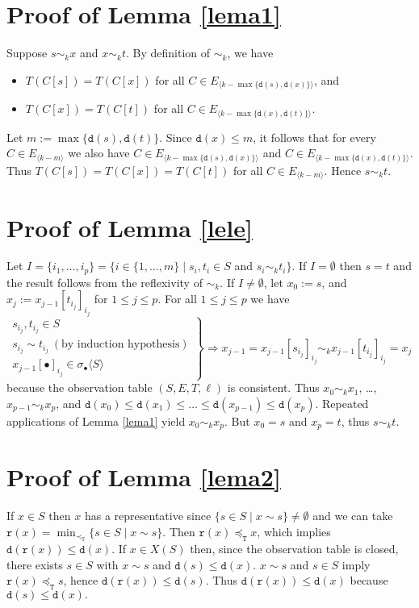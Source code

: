 \documentclass[preprint,12pt,english]{article}
\def\hole{\bullet}
\def\tr{\mathtt{r}}
\def\depth{\mathtt{d}}
\newcommand\pair[1]{\langle{#1}\rangle}
\begin{document}
\section{Proof of Lemma \ref{lema1}}
Suppose  $s\sim_k x$ and $x\sim_k t.$ By definition of $\sim_k$, we have 
\begin{itemize}
\item[] $T(C[s])=T(C[x])$ for all $C\in E_{\pair{k-\max\{\depth(s),\depth(x)\}}}$, and
\item[] $T(C[x])=T(C[t])$ for all $C\in E_{\pair{k-\max\{\depth(x),\depth(t)\}}}$.
\end{itemize}
Let $m:=\max\{\depth(s),\depth(t)\}.$ Since $\depth(x)\leq m$, it follows that for every $C\in  E_{\pair{k-m}}$ we also have $C\in E_{\pair{k-\max\{\depth(s),\depth(x)\}}}$ and $C\in E_{\pair{k-\max\{\depth(x),\depth(t)\}}}$. Thus $T(C[s])=T(C[x])=T(C[t])$ for all $C\in  E_{\pair{k-m}}$. Hence $s\sim_k t.$
\section{Proof of Lemma \ref{lele}}
Let $I=\{i_1,\ldots,i_p\}=\{i\in\{1,\ldots,m\}\mid s_i,t_i\in S$ and $s_i\sim_k t_i\}$. 
If $I=\emptyset$ then $s=t$ and the result follows from the reflexivity of $\sim_k$. 
If $I\neq\emptyset$, let $x_0:=s$, and $x_j:=x_{j-1}[t_{i_j}]_{i_j}$ for $1\leq j\leq p$.
For all $1\leq j\leq p$ we have
$$\left.\begin{array}{r}
s_{i_j},t_{i_j}\in S\\ 
s_{i_j}\sim t_{i_j}\ (\text{by induction hypothesis})\\
x_{j-1}[\hole]_{i_j}\in\sigma_\hole\pair{S} 
\end{array}\right\}\Rightarrow x_{j-1}=x_{j-1}[s_{i_j}]_{i_j}\sim_k x_{j-1}[t_{i_j}]_{i_j}=x_j$$
because the observation table $(S,E,T,\ell)$ is consistent. Thus $x_0\sim_k x_1$, \ldots, $x_{p-1}\sim_k x_p$, and $\depth(x_0)\leq\depth(x_1)\leq\ldots\leq\depth(x_{p-1})\leq\depth(x_p).$ Repeated applications of Lemma \ref{lema1} yield $x_0\sim_k x_p.$ But $x_0=s$ and $x_p=t$, thus $s\sim_k t.$
\section{Proof of Lemma \ref{lema2}}
If $x\in S$ then $x$ has a representative since $\{s\in S\mid x\sim s\}\neq\emptyset$ and we can take $\tr(x)=\min_{\prec_{\mathtt{T}}}\{s\in S\mid x\sim s\}$. Then $\tr(x)\preceq_{\mathtt{T}} x$, which implies $\depth(\tr(x))\leq \depth(x).$ If $x\in X(S)$ then, since the observation table is closed, there exists $s\in S$ with $x\sim s$ and $\depth(s)\leq \depth(x).$ $x\sim s$ and $s\in S$ imply $\tr(x)\preceq_{\mathtt{T}} s$, hence $\depth(\tr(x))\leq \depth(s)$. Thus $\depth(\tr(x))\leq \depth(x)$ because $\depth(s)\leq \depth(x).$ 
\end{document}
